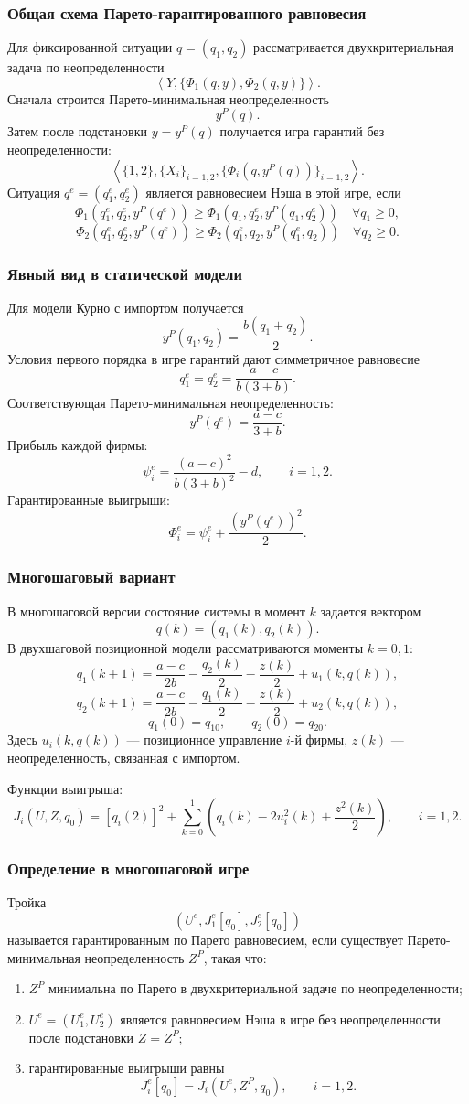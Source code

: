 \documentclass[12pt,a4paper]{article}
\begin{document}
\subsubsection{Общая схема Парето-гарантированного равновесия}
Для фиксированной ситуации $q=(q_1,q_2)$ рассматривается двухкритериальная задача по неопределенности
\[
\left\langle Y,\{\Phi_1(q,y),\Phi_2(q,y)\}\right\rangle.
\]
Сначала строится Парето-минимальная неопределенность
\[
y^P(q).
\]
Затем после подстановки $y=y^P(q)$ получается игра гарантий без неопределенности:
\[
\left\langle \{1,2\},\{X_i\}_{i=1,2},\{\Phi_i(q,y^P(q))\}_{i=1,2}\right\rangle.
\]
Ситуация $q^e=(q_1^e,q_2^e)$ является равновесием Нэша в этой игре, если
\[
\Phi_1(q_1^e,q_2^e,y^P(q^e))\ge
\Phi_1(q_1,q_2^e,y^P(q_1,q_2^e))\quad \forall q_1\ge 0,
\]
\[
\Phi_2(q_1^e,q_2^e,y^P(q^e))\ge
\Phi_2(q_1^e,q_2,y^P(q_1^e,q_2))\quad \forall q_2\ge 0.
\]

\subsubsection{Явный вид в статической модели}
Для модели Курно с импортом получается
\[
y^P(q_1,q_2)=\frac{b(q_1+q_2)}{2}.
\]
Условия первого порядка в игре гарантий дают симметричное равновесие
\[
q_1^e=q_2^e=\frac{a-c}{b(3+b)}.
\]
Соответствующая Парето-минимальная неопределенность:
\[
y^P(q^e)=\frac{a-c}{3+b}.
\]
Прибыль каждой фирмы:
\[
\psi_i^e=\frac{(a-c)^2}{b(3+b)^2}-d,
\qquad i=1,2.
\]
Гарантированные выигрыши:
\[
\Phi_i^e=\psi_i^e+\frac{(y^P(q^e))^2}{2}.
\]

\subsubsection{Многошаговый вариант}
В многошаговой версии состояние системы в момент $k$ задается вектором
\[
q(k)=(q_1(k),q_2(k)).
\]
В двухшаговой позиционной модели рассматриваются моменты $k=0,1$:
\[
q_1(k+1)=\frac{a-c}{2b}-\frac{q_2(k)}{2}-\frac{z(k)}{2}+u_1(k,q(k)),
\]
\[
q_2(k+1)=\frac{a-c}{2b}-\frac{q_1(k)}{2}-\frac{z(k)}{2}+u_2(k,q(k)),
\]
\[
q_1(0)=q_{10},\qquad q_2(0)=q_{20}.
\]
Здесь $u_i(k,q(k))$ --- позиционное управление $i$-й фирмы, $z(k)$ --- неопределенность, связанная с импортом.

Функции выигрыша:
\[
J_i(U,Z,q_0)=[q_i(2)]^2+\sum_{k=0}^{1}\left(q_i(k)-2u_i^2(k)+\frac{z^2(k)}{2}\right),
\qquad i=1,2.
\]

\subsubsection{Определение в многошаговой игре}
Тройка
\[
(U^e,J_1^e[q_0],J_2^e[q_0])
\]
называется гарантированным по Парето равновесием, если существует Парето-минимальная неопределенность $Z^P$, такая что:
\begin{enumerate}
  \item $Z^P$ минимальна по Парето в двухкритериальной задаче по неопределенности;
  \item $U^e=(U_1^e,U_2^e)$ является равновесием Нэша в игре без неопределенности после подстановки $Z=Z^P$;
  \item гарантированные выигрыши равны
  \[
  J_i^e[q_0]=J_i(U^e,Z^P,q_0),\qquad i=1,2.
  \]
\end{enumerate}
\end{document}
